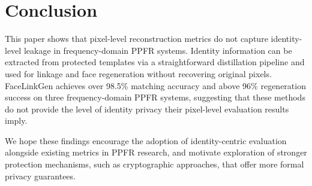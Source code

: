 \section{Conclusion}
This paper shows that pixel-level reconstruction metrics do not capture identity-level leakage in frequency-domain PPFR systems. Identity information can be extracted from protected templates via a straightforward distillation pipeline and used for linkage and face regeneration without recovering original pixels. FaceLinkGen achieves over 98.5\% matching accuracy and above 96\% regeneration success on three frequency-domain PPFR systems, suggesting that these methods do not provide the level of identity privacy their pixel-level evaluation results imply.

We hope these findings encourage the adoption of identity-centric evaluation alongside existing metrics in PPFR research, and motivate exploration of stronger protection mechanisms, such as cryptographic approaches, that offer more formal privacy guarantees.
\newpage




 





